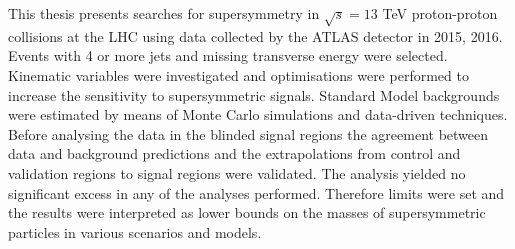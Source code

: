         \noindent This thesis presents searches for supersymmetry in $\sqrt{s}=13$ TeV proton-proton collisions at the LHC using data collected by the ATLAS detector in 2015, 2016. Events with 4 or more jets and missing transverse energy were selected. Kinematic variables were investigated and optimisations were performed to increase the sensitivity to supersymmetric signals. Standard Model backgrounds were estimated by means of Monte Carlo simulations and data-driven techniques. Before analysing the data in the blinded signal regions the agreement between data and background predictions and the extrapolations from control and validation regions to signal regions were validated. The analysis yielded no significant excess in any of the analyses performed. Therefore limits were set and the results were interpreted as lower bounds on the masses of supersymmetric particles in various scenarios and models.
